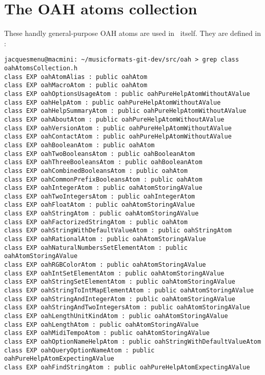 
\chapter{The OAH atoms collection}\label{The OAH atoms collection}

These handly general-purpose OAH atoms are used in \mf\ itself. They are defined in :
\begin{lstlisting}[language=Terminal]
jacquesmenu@macmini: ~/musicformats-git-dev/src/oah > grep class oahAtomsCollection.h
class EXP oahAtomAlias : public oahAtom
class EXP oahMacroAtom : public oahAtom
class EXP oahOptionsUsageAtom : public oahPureHelpAtomWithoutAValue
class EXP oahHelpAtom : public oahPureHelpAtomWithoutAValue
class EXP oahHelpSummaryAtom : public oahPureHelpAtomWithoutAValue
class EXP oahAboutAtom : public oahPureHelpAtomWithoutAValue
class EXP oahVersionAtom : public oahPureHelpAtomWithoutAValue
class EXP oahContactAtom : public oahPureHelpAtomWithoutAValue
class EXP oahBooleanAtom : public oahAtom
class EXP oahTwoBooleansAtom : public oahBooleanAtom
class EXP oahThreeBooleansAtom : public oahBooleanAtom
class EXP oahCombinedBooleansAtom : public oahAtom
class EXP oahCommonPrefixBooleansAtom : public oahAtom
class EXP oahIntegerAtom : public oahAtomStoringAValue
class EXP oahTwoIntegersAtom : public oahIntegerAtom
class EXP oahFloatAtom : public oahAtomStoringAValue
class EXP oahStringAtom : public oahAtomStoringAValue
class EXP oahFactorizedStringAtom : public oahAtom
class EXP oahStringWithDefaultValueAtom : public oahStringAtom
class EXP oahRationalAtom : public oahAtomStoringAValue
class EXP oahNaturalNumbersSetElementAtom : public oahAtomStoringAValue
class EXP oahRGBColorAtom : public oahAtomStoringAValue
class EXP oahIntSetElementAtom : public oahAtomStoringAValue
class EXP oahStringSetElementAtom : public oahAtomStoringAValue
class EXP oahStringToIntMapElementAtom : public oahAtomStoringAValue
class EXP oahStringAndIntegerAtom : public oahAtomStoringAValue
class EXP oahStringAndTwoIntegersAtom : public oahAtomStoringAValue
class EXP oahLengthUnitKindAtom : public oahAtomStoringAValue
class EXP oahLengthAtom : public oahAtomStoringAValue
class EXP oahMidiTempoAtom : public oahAtomStoringAValue
class EXP oahOptionNameHelpAtom : public oahStringWithDefaultValueAtom
class EXP oahQueryOptionNameAtom : public oahPureHelpAtomExpectingAValue
class EXP oahFindStringAtom : public oahPureHelpAtomExpectingAValue
\end{lstlisting}


